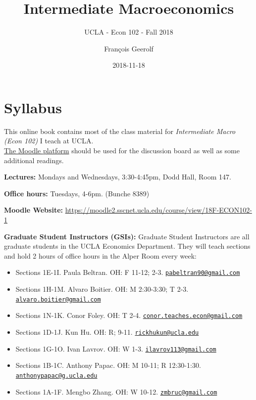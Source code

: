 \documentclass[]{book}
\title{Intermediate Macroeconomics}
\subtitle{UCLA - Econ 102 - Fall 2018}
\author{François Geerolf}
\date{2018-11-18}
\providecommand{\tightlist}{%
  \setlength{\itemsep}{0pt}\setlength{\parskip}{0pt}}
\theoremstyle{definition}
\theoremstyle{definition}
\theoremstyle{definition}
\theoremstyle{remark}
\begin{document}
\maketitle

{
\setcounter{tocdepth}{1}
\tableofcontents
}
\listoftables
\listoffigures
\chapter*{Syllabus}\label{syllabus}

This online book contains most of the class material for
\emph{Intermediate Macro (Econ 102)} I teach at UCLA.\\
\href{https://moodle2.sscnet.ucla.edu/course/view/18F-ECON102-1}{The
Moodle platform} should be used for the discussion board as well as some
additional readings.

\textbf{Lectures:} Mondays and Wednesdays, 3:30-4:45pm, Dodd Hall, Room
147.

\textbf{Office hours:} Tuesdays, 4-6pm. (Bunche 8389)

\textbf{Moodle Website:}
\url{https://moodle2.sscnet.ucla.edu/course/view/18F-ECON102-1}

\textbf{Graduate Student Instructors (GSIs):} Graduate Student
Instructors are all graduate students in the UCLA Economics Department.
They will teach sections and hold 2 hours of office hours in the Alper
Room every week:

\begin{itemize}
\tightlist
\item
  Sections 1E-1I. Paula Beltran. OH: F 11-12; 2-3.
  \href{mailto:pabeltran90@gmail.com}{\nolinkurl{pabeltran90@gmail.com}}
\item
  Sections 1H-1M. Alvaro Boitier. OH: M 2:30-3:30; T 2-3.
  \href{mailto:alvaro.boitier@gmail.com}{\nolinkurl{alvaro.boitier@gmail.com}}
\item
  Sections 1N-1K. Conor Foley. OH: T 2-4.
  \href{mailto:conor.teaches.econ@gmail.com}{\nolinkurl{conor.teaches.econ@gmail.com}}
\item
  Sections 1D-1J. Kun Hu. OH: R; 9-11.
  \href{mailto:rickhukun@ucla.edu}{\nolinkurl{rickhukun@ucla.edu}}
\item
  Sections 1G-1O. Ivan Lavrov. OH: W 1-3.
  \href{mailto:ilavrov113@gmail.com}{\nolinkurl{ilavrov113@gmail.com}}
\item
  Sections 1B-1C. Anthony Papac. OH: M 10-11; R 12:30-1:30.
  \href{mailto:anthonypapac@g.ucla.edu}{\nolinkurl{anthonypapac@g.ucla.edu}}
\item
  Sections 1A-1F. Mengbo Zhang. OH: W 10-12.
  \href{mailto:zmbruc@gmail.com}{\nolinkurl{zmbruc@gmail.com}}
\end{itemize}
\end{document}
